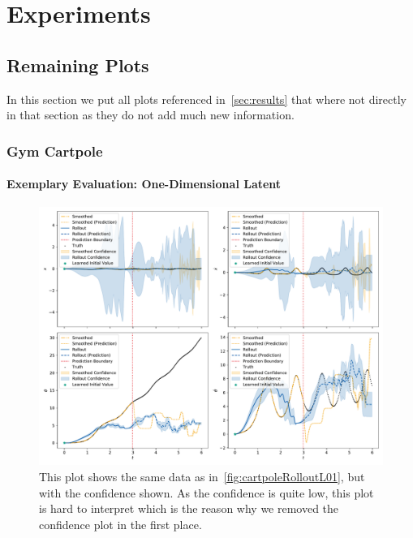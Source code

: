 \chapter{Experiments}



\section{Remaining Plots}
	\label{app:remainingPlots}

	In this section we put all plots referenced in~\autoref{sec:results} that where not directly in that section as they do not add much new information.

	\subsection{Gym Cartpole}
		\subsubsection{Exemplary Evaluation: One-Dimensional Latent}
			\begin{figure}
				\centering
				\includegraphics[width=\linewidth]{figures/results/cartpole-gym/run-latent-dim-02/rollout-observations-N0.pdf}
				\caption{This plot shows the same data as in~\autoref{fig:cartpoleRolloutL01}, but with the confidence shown. As the confidence is quite low, this plot is hard to interpret which is the reason why we removed the confidence plot in the first place.}
				\label{fig:cartpoleRolloutL01Appendix}
			\end{figure}

